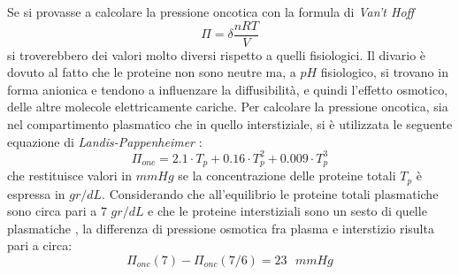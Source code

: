 Se si provasse a calcolare la pressione oncotica con la formula di \textit{Van't Hoff} $$\Pi=\delta \frac{nRT}{V}$$ si troverebbero dei valori molto diversi rispetto a quelli fisiologici. Il divario è dovuto al fatto che le proteine non sono neutre ma, a $pH$ fisiologico, si trovano in forma anionica e tendono a influenzare la diffusibilità, e quindi l'effetto osmotico, delle altre molecole elettricamente cariche. Per calcolare la pressione oncotica, sia nel compartimento plasmatico che in quello interstiziale, si è utilizzata le seguente equazione di \textit{Landis-Pappenheimer} \cite{original_L-P, corrected_L-P}:
\begin{equation}
	\Pi_{onc} = 2.1\cdot T_p + 0.16\cdot T_p^2 + 0.009\cdot T_p^3
	\label{LPpl}
\end{equation}
che restituisce valori in $mmHg$ se la concentrazione delle proteine totali $T_p$ è espressa in $gr/dL$.
Considerando che all'equilibrio le proteine totali plasmatiche sono circa pari a $7$ $gr/dL$ e che le proteine interstiziali sono un sesto di quelle plasmatiche \cite{guyton}, la differenza di pressione osmotica fra plasma e interstizio risulta pari a circa:
$$\Pi_{onc}(7)-\Pi_{onc}(7/6)=23\text{ }mmHg$$
